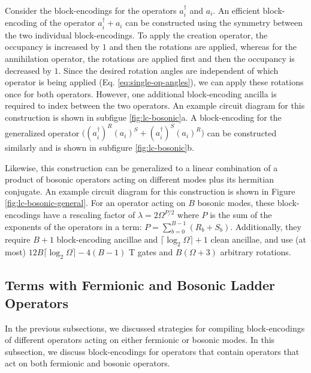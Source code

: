 Consider the block-encodings for the operators $a_i^\dagger$ and $a_i$.
An efficient block-encoding of the operator $a_i^\dagger + a_i$ can be constructed using the symmetry between the two individual block-encodings. 
To apply the creation operator, the occupancy is increased by $1$ and then the rotations are applied, whereas for the annihilation operator, the rotations are applied first and then the occupancy is decreased by $1$.
Since the desired rotation angles are independent of which operator is being applied (Eq. \ref{eq:single-op-angles}), we can apply these rotations once for both operators.
However, one additional block-encoding ancilla is required to index between the two operators.
An example circuit diagram for this construction is shown in subfigue \ref{fig:lc-bosonic}a.
A block-encoding for the generalized operator $\big((a_i^\dagger)^R (a_i)^S + (a_i^\dagger)^S (a_i)^R\big)$ can be constructed similarly and is shown in subfigure \ref{fig:lc-bosonic}b.

\begin{figure*}
    
    \caption{
        \textbf{Generalized Block-Encoding Product of Bosonic Ladder Operators Plus Hermitian Conjugate}
        A block-encoding for the operator $((a_i^\dagger)^{R_i} + a_i^{S_i})((a_j^\dagger)^{R_j} + a_j^{S_j})...((a_m^\dagger)^{R_m} + a_m^{S_m}) + h.c.$ is given.
    }
    \label{fig:lc-bosonic-general}
\end{figure*}

Likewise, this construction can be generalized to a linear combination of a product of bosonic operators acting on different modes plus its hermitian conjugate.
An example circuit diagram for this construction is shown in Figure \ref{fig:lc-bosonic-general}.
For an operator acting on $B$ bosonic modes, these block-encodings have a rescaling factor of $\lambda = 2 \Omega^{P/2}$ where $P$ is the sum of the exponents of the operators in a term: $P = \sum_{b=0}^{B-1}(R_b+S_b)$.
Additionally, they require $B+1$ block-encoding ancillae and $\lceil{\log_2{\Omega}}\rceil + 1$ clean ancillae, and use (at most)  $12B \lceil \log_2 \Omega \rceil - 4(B - 1)$ T gates and $B(\Omega + 3)$ arbitrary rotations.


\subsection{Terms with Fermionic and Bosonic Ladder Operators}

In the previous subsections, we discussed strategies for compiling block-encodings of different operators acting on either fermionic or bosonic modes.
In this subsection, we discuss block-encodings for operators that contain operators that act on both fermionic and bosonic operators.

